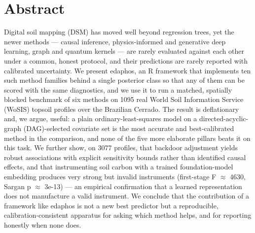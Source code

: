 \documentclass[10pt,letterpaper]{article}
\newcommand{\getIndex}[2]{
  \ForEach{,}{\IfEq{#1}{\thislevelitem}{\number\thislevelcount\ExitForEach}{}}{#2}
}
\newcommand{\getAff}[1]{
  \getIndex{#1}{Independent researcher}
}
\begin{document}
\vspace*{0.2in}


\section*{Abstract}
Digital soil mapping (DSM) has moved well beyond regression trees, yet
the newer methods --- causal inference, physics-informed and generative
deep learning, graph and quantum kernels --- are rarely evaluated
against each other under a common, honest protocol, and their
predictions are rarely reported with calibrated uncertainty. We present
edaphos, an R framework that implements ten such method families behind
a single posterior class so that any of them can be scored with the same
diagnostics, and we use it to run a matched, spatially blocked benchmark
of six methods on 1095 real World Soil Information Service (WoSIS)
topsoil profiles over the Brazilian Cerrado. The result is deflationary
and, we argue, useful: a plain ordinary-least-squares model on a
directed-acyclic-graph (DAG)-selected covariate set is the most accurate
and best-calibrated method in the comparison, and none of the five more
elaborate pillars beats it on this task. We further show, on 3077
profiles, that backdoor adjustment yields robust associations with
explicit sensitivity bounds rather than identified causal effects, and
that instrumenting soil carbon with a trained foundation-model embedding
produces very strong but invalid instruments (first-stage F \(\approx\)
4630, Sargan p \(\approx\) 3e-13) --- an empirical confirmation that a
learned representation does not manufacture a valid instrument. We
conclude that the contribution of a framework like edaphos is not a new
best predictor but a reproducible, calibration-consistent apparatus for
asking which method helps, and for reporting honestly when none does.
\end{document}
